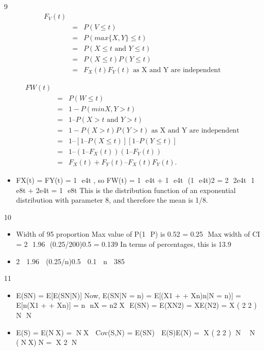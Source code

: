 \documentclass[a4paper,12pt]{article}
\begin{document}
9
\begin{eqnarray*}
F_V (t)\\ &=& P(V \leq t)\\ &=& P(max \{X, Y\} \leq t)
\\ &=& P(X \leq t \mbox{ and } Y \leq t)\\ &=& P(X \leq t) P(Y \leq t)\\ &=& F_X (t)F_Y (t)\mbox{ as X  and  Y are independent} 
\end{eqnarray*}

\begin{eqnarray*}
F W (t)\\ &=& P(W \leq t)\\ &=& 1 - P(min{X, Y} > t)
\\ &=& 1 – P(X > t \mbox{ and } Y > t)\\ &=& 1 - P(X > t) P(Y > t) \mbox{ as X  and  Y are independent} 
\\ &=& 1 – [1 – P(X \leq t)] [1 – P(Y \leq t)]
\\ &=& 1 – (1 – F_X (t)) (1 – F_Y (t))
\\ &=& F_X (t) + F_Y (t) – F_X (t)F_Y (t) .
\end{eqnarray*}

\begin{itemize}

\item
FX(t) = FY(t) = 1  e4t , so
FW(t) = 1  e4t + 1  e4t  (1  e4t)2
= 2  2e4t  1  e8t + 2e4t
= 1  e8t
This is the distribution function of an exponential distribution with parameter 8, and
therefore the mean is 1/8.
\end{itemize}

10  
\begin{itemize}
\item Width of 95%
proportion
Max value of P(1  P) is 0.52 = 0.25
 Max width of CI = 2  1.96  (0.25/200)0.5 = 0.139
In terms of percentages, this is 13.9%
\item 2  1.96  (0.25/n)0.5  0.1  n  385
\end{itemize}
11 
\begin{itemize}
\item E(SN) = E[E(SN|N)]
Now, E(SN|N = n) = E[(X1 + + Xn)n|N = n)] = E[n(X1 + + Xn)]
= n  nX = n2
X
 E(SN) = E(XN2) = XE(N2)
= X
( 2 2 ) N  N

\item E(S) = E(NX) = NX
 Cov(S,N) = E(SN)  E(S)E(N) = X
( 2 2 ) N  N  (NX)N = X
2
N

\end{itemize}
\end{document}
